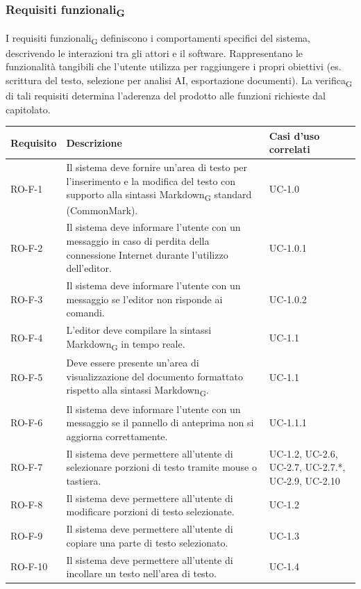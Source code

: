 \documentclass[11pt,a4paper]{article}
\newcommand{\gls}[1]{#1\textsubscript{G}}
\begin{document}
\subsubsection{\gls{Requisiti funzionali}}
I \gls{requisiti funzionali} definiscono i comportamenti specifici del sistema, descrivendo le interazioni tra gli attori e il software.
Rappresentano le funzionalità tangibili che l'utente utilizza per raggiungere i propri obiettivi (es. scrittura del testo, selezione per analisi AI, esportazione documenti). La \gls{verifica} di tali requisiti determina l'aderenza del prodotto alle funzioni richieste dal capitolato.

\begin{longtable}{|p{}|>{\raggedright\arraybackslash}p{}|p{}|}
\hline
\textbf{Requisito} & \textbf{Descrizione} & \textbf{Casi d'uso correlati}\\
\hline
\endhead
RO-F-1 & Il sistema deve fornire un'area di testo per l'inserimento e la modifica del testo con supporto alla sintassi \gls{Markdown} standard (CommonMark). & UC-1.0 \\
\hline
RO-F-2 & Il sistema deve informare l'utente con un messaggio in caso di perdita della connessione Internet durante l'utilizzo dell'editor. & UC-1.0.1 \\
\hline
RO-F-3 & Il sistema deve informare l'utente con un messaggio se l'editor non risponde ai comandi. & UC-1.0.2 \\
\hline
RO-F-4 & L'editor deve compilare la sintassi \gls{Markdown} in tempo reale. & UC-1.1 \\
\hline
RO-F-5 & Deve essere presente un'area di visualizzazione del documento formattato rispetto alla sintassi \gls{Markdown}. & UC-1.1 \\
\hline
RO-F-6 & Il sistema deve informare l'utente con un messaggio se il pannello di anteprima non si aggiorna correttamente. & UC-1.1.1 \\
\hline
RO-F-7 & Il sistema deve permettere all'utente di selezionare porzioni di testo tramite mouse o tastiera. & UC-1.2, UC-2.6, UC-2.7, UC-2.7.*, UC-2.9, UC-2.10 \\
\hline
RO-F-8 & Il sistema deve permettere all'utente di modificare porzioni di testo selezionate. & UC-1.2 \\
\hline
RO-F-9 & Il sistema deve permettere all'utente di copiare una parte di testo selezionato. & UC-1.3 \\
\hline
RO-F-10 & Il sistema deve permettere all'utente di incollare un testo nell'area di testo. & UC-1.4 \\

\end{longtable}
\end{document}
